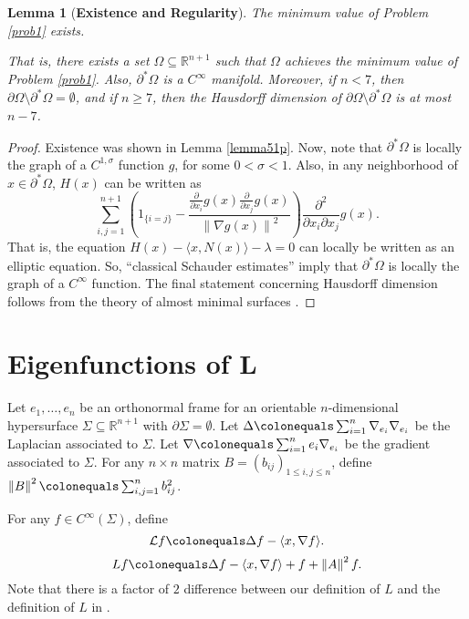 \documentclass[12pt,reqno]{amsart}
\newtheorem{lemma}[theorem]{Lemma}
\theoremstyle{definition}
\renewcommand{\subset}{\subseteq}
\newcommand{\vnormt}[1]{\left\|#1\right\|}    %
\newcommand{\R}{\mathbb{R}}
\newcommand{\embolden}[1]{\textbf {#1}}
\newcommand{\redA}{\partial^{*}\Omega}
\newcommand{\sdimn}{n}
\newcommand{\adimn}{n+1}
\newcommand{\scon}{\lambda}
\begin{document}
\begin{lemma}[\embolden{Existence and Regularity}]\label{lemma51}
The minimum value of Problem \ref{prob1} exists.

That is, there exists a set $\Omega\subset\R^{\adimn}$ %
such that $\Omega$ achieves the minimum value of Problem \ref{prob1}.  Also, $\redA$ is a $C^{\infty}$ manifold.  Moreover, if $\sdimn<7$, then $\partial\Omega\setminus\redA=\emptyset$, and if $n\geq7$, then the Hausdorff dimension of $\partial\Omega\setminus\redA$ is at most $n-7$.
\end{lemma}
\begin{proof}
Existence was shown in Lemma \ref{lemma51p}.  Now, note that $\redA$ is locally the graph of a $C^{1,\sigma}$ function $g$, for some $0<\sigma<1$.  Also, in any neighborhood of $x\in\redA$, $H(x)$ can be written as \cite{evans93}
$$\sum_{i,j=1}^{\adimn}\left(1_{\{i=j\}}-\frac{\frac{\partial}{\partial x_{i}}g(x)\frac{\partial}{\partial x_{j}}g(x)}{\vnormt{\nabla g(x)}^{2}}\right)
\frac{\partial^{2}}{\partial x_{i}\partial x_{j}}g(x).$$
That is, the equation $H(x)-\langle x,N(x)\rangle-\scon=0$ can locally be written as an elliptic equation.  So, ``classical Schauder estimates'' imply that $\redA$ is locally the graph of a $C^{\infty}$ function.  The final statement concerning Hausdorff dimension follows from the theory of almost minimal surfaces \cite[Proposition 2]{barchiesi16} \cite[Theorem 21.8]{maggi12}.
\end{proof}



\section{Eigenfunctions of L}\label{seceig}

Let $e_{1},\ldots,e_{\sdimn}$ be an orthonormal frame for an orientable $\sdimn$-dimensional hypersurface $\Sigma\subset\R^{\adimn}$ with $\partial\Sigma=\emptyset$.  Let $\Delta\colonequals\sum_{i=1}^{\sdimn}\nabla_{e_{i}}\nabla_{e_{i}}$ be the Laplacian associated to $\Sigma$. Let $\nabla\colonequals\sum_{i=1}^{\sdimn}e_{i}\nabla_{e_{i}}$ be the gradient associated to $\Sigma$.
For any $\sdimn\times\sdimn$ matrix $B=(b_{ij})_{1\leq i,j\leq\sdimn}$, define $\vnormt{B}^{2}\colonequals\sum_{i,j=1}^{\sdimn}b_{ij}^{2}$.


For any $f\in C^{\infty}(\Sigma)$, define
\begin{equation}\label{three4.3}
\mathcal{L}f\colonequals \Delta f-\langle x,\nabla f\rangle.
\end{equation}
\begin{equation}\label{three4.5}
L f\colonequals \Delta f-\langle x,\nabla f\rangle+f+\vnormt{A}^{2}f.
\end{equation}
Note that there is a factor of $2$ difference between our definition of $L$ and the definition of $L$ in \cite{colding12a}.
\end{document}
